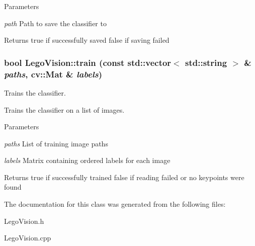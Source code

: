 \begin{DoxyParams}{Parameters}
\item[{\em path}]Path to save the classifier to \end{DoxyParams}
\begin{DoxyReturn}{Returns}
true if successfully saved false if saving failed 
\end{DoxyReturn}
\hypertarget{classLegoVision_a8ada425fb6a2c65a4de8e81bb1fc4a72}{
\subsubsection[{train}]{\setlength{\rightskip}{0pt plus 5cm}bool LegoVision::train (const std::vector$<$ std::string $>$ \& {\em paths}, \/  cv::Mat \& {\em labels})}}
\label{classLegoVision_a8ada425fb6a2c65a4de8e81bb1fc4a72}


Trains the classifier. 

Trains the classifier on a list of images.


\begin{DoxyParams}{Parameters}
\item[{\em paths}]List of training image paths \item[{\em labels}]Matrix containing ordered labels for each image \end{DoxyParams}
\begin{DoxyReturn}{Returns}
true if successfully trained false if reading failed or no keypoints were found 
\end{DoxyReturn}


The documentation for this class was generated from the following files:\begin{DoxyCompactItemize}
\item 
LegoVision.h\item 
LegoVision.cpp\end{DoxyCompactItemize}

